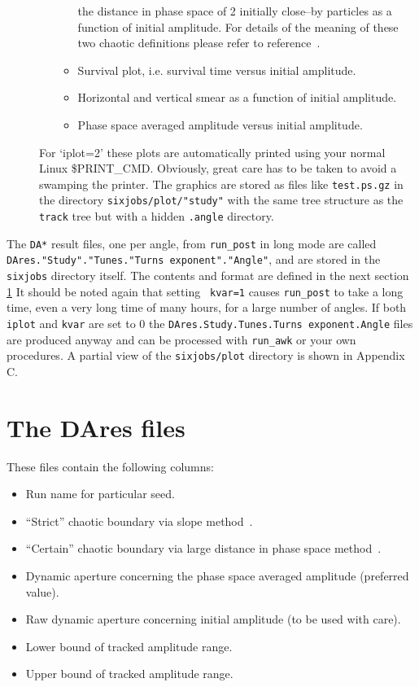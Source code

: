 \documentclass{cernatsnote}
\begin{document}
\begin{description}
\begin{itemize}
\begin{itemize}
      the distance in phase space of 2 initially close--by particles
      as a function of initial amplitude. For details of the meaning
      of these two chaotic definitions please refer to
      reference~\cite{LHC8}.
    \item Survival plot, i.e. survival time versus initial amplitude.
    \item Horizontal and vertical smear as a function of initial
      amplitude.
    \item Phase space averaged amplitude versus initial amplitude.
    \end{itemize}
  \end{itemize}
  For `iplot=2' these plots are automatically printed using
  your normal Linux \$PRINT\_CMD.
  Obviously, great care has to be taken to avoid a
  swamping the printer. The graphics are stored as files
  like \texttt{test.ps.gz} in the directory  
  \texttt{sixjobs/plot/"study"} with the same tree structure as the
  \texttt{track} tree but with a hidden \texttt{.angle} directory.
\end{description}

The \texttt{DA*} result files, one per angle, from \texttt{run\_post} in long mode
are called \texttt{DAres."Study"."Tunes."Turns exponent"."Angle"}, and are stored
in the \texttt{sixjobs} directory itself.  The contents and format are defined in
the next section \ref{sec:DAres} It should be noted again that setting {\tt
kvar=1} causes \texttt{run\_post} to take a long time, even a very long time of
many hours, for a large number of angles. If both \texttt{iplot} and \texttt{kvar}
are set to 0 the \texttt{DAres.Study.Tunes.Turns exponent.Angle} files are
produced anyway and can be processed with \texttt{run\_awk} or your own
procedures. A partial view of the \texttt{sixjobs/plot} directory is shown in
Appendix C.

\section{The DAres files}
\label{sec:DAres}
These files contain the following columns:
\begin{itemize}
\item Run name for particular seed.
\item ``Strict'' chaotic boundary via slope method~\cite{LHC8}.
\item ``Certain'' chaotic boundary via large distance in phase space
  method~\cite{LHC8}.
\item Dynamic aperture concerning the phase space averaged amplitude
  (preferred value).
\item Raw dynamic aperture concerning initial amplitude (to be used
  with care).
\item Lower bound of tracked amplitude range.
\item Upper bound of tracked amplitude range.
\end{itemize}
\end{document}
